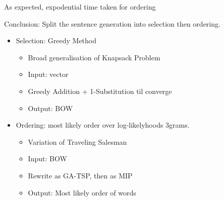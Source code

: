 \documentclass[]{beamer}
\begin{document}
\begin{frame}{As expected, expodential time taken for ordering}
\end{frame}




\begin{frame}{Conclusion: Split the sentence generation into selection then ordering.}
	\begin{itemize}
		\item<1->Selection: Greedy Method
		\begin{itemize}
			\item Broad generalisation of Knapsack Problem
			\item Input: vector
			\item Greedy Addition + 1-Substitution til converge
			\item Output: BOW
		\end{itemize}
		\vfill
		\item<2->Ordering: most likely order over log-likelyhoods 3grams.
		\begin{itemize}
			\item Variation of Traveling Salesman
			\item Input: BOW
			\item Rewrite as GA-TSP, then as MIP
			\item Output: Most likely order of words
		\end{itemize}
	\end{itemize}
\end{frame}
\end{document}
